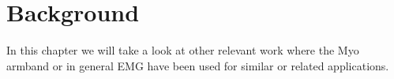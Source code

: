 \chapter{Background}
\label{chap:background}
In this chapter we will take a look at other relevant work where the Myo armband or in general EMG have been used for similar or related applications.




